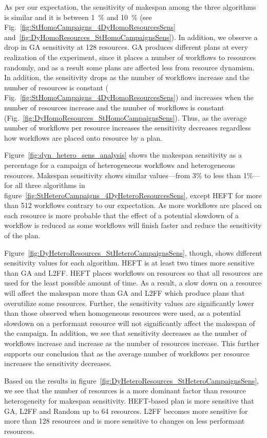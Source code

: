 As per our expectation, the sensitivity of makespan among the three algorithms is similar and it is between 1~\% and 10~\% (see Fig.~\ref{fig:StHomoCampaigns_4DyHomoResourcesSens} and~\ref{fig:DyHomoResources_StHomoCampaignsSens}).
In addition, we observe a drop in GA sensitivity at 128 resources.
GA produces different plans at every realization of the experiment, since it places a number of workflows to resources randomly, and as a result some plans are affected less from resource dynamism.
In addition, the sensitivity drops as the number of workflows increase and the number of resources is constant ( Fig.~\ref{fig:StHomoCampaigns_4DyHomoResourcesSens}) and increases when the number of resources increase and the number of workflows is constant (Fig.~\ref{fig:DyHomoResources_StHomoCampaignsSens}).
Thus, as the average number of workflows per resource increases the sensitivity decreases regardless how workflows are placed onto resource by a plan.

Figure~\ref{fig:dyn_hetero_sens_analysis} shows the makespan sensitivity as a percentage for a campaign of heterogeneous workflows and heterogeneous resources.
Makespan sensitivity shows similar values---from 3\% to less than 1\%---for all three algorithms in figure~\ref{fig:StHeteroCampaigns_4DyHeteroResourcesSens}, except HEFT for more than 512 workflows contrary to our expectation.
As more workflows are placed on each resource is more probable that the effect of a potential slowdown of a workflow is reduced as some workflows will finish faster and reduce the sensitivity of the plan.


Figure~\ref{fig:DyHeteroResources_StHeteroCampaignsSens}, though, shows different sensitivity values for each algorithm.
HEFT is at least two times more sensitive than GA and L2FF.
HEFT places workflows on resources so that all resources are used for the least possible amount of time.
As a result, a slow down on a resource will affect the makespan more than GA and L2FF which produce plans that overutilize some resources.
Further, the sensitivity values are significantly lower than those observed when homogeneous resources were used, as a potential slowdown on a performant resource will not significantly affect the makespan of the campaign.
In addition, we see that sensitivity decreases as the number of workflows increase and increase as the number of resources increase.
This further supports our conclusion that as the average number of workflows per resource increases the sensitivity decreases.

Based on the results in figure~\ref{fig:DyHeteroResources_StHeteroCampaignsSens}, we see that the number of resources is a more dominant factor than resource heterogeneity for makespan sensitivity.
HEFT-based plan is more sensitive that GA, L2FF and Random up to 64 resources.
L2FF becomes more sensitive for more than 128 resources and is more sensitive to changes on less performant resources.

